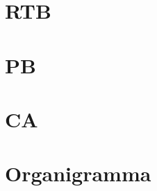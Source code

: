 \documentclass[8pt]{article}
\begin{document}
\section{RTB}

\newpage
\section{PB}
\newpage
\section{CA}
\newpage
\section{Organigramma}

\end{document}
